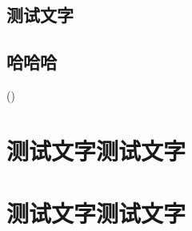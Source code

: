 \documentclass[themecolor=brown]{textbook-cn}
\begin{document}
\cleardoublepage

\lipsum



\chapter{测试文字}

\chapter{哈哈哈}
\lipsum

(\firstrightxmark)
\partintro{\lipsum[2]}
\part*{测试文字测试文字}


\partsubtitle{ }
\partintro{\lipsum[2]}
\part*{测试文字测试文字}
\end{document}
